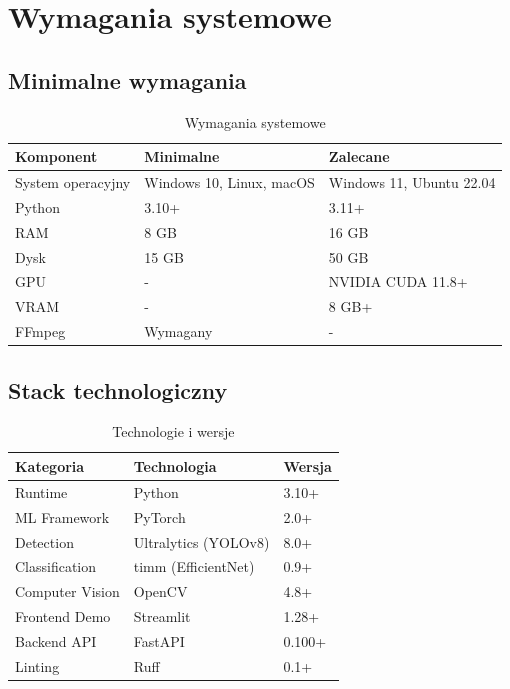 \documentclass[12pt,a4paper]{article}
\begin{document}
\section{Wymagania systemowe}

\subsection{Minimalne wymagania}

\begin{table}[H]
\centering
\caption{Wymagania systemowe}
\begin{tabular}{|l|l|l|}
\hline
\textbf{Komponent} & \textbf{Minimalne} & \textbf{Zalecane} \\
\hline
System operacyjny & Windows 10, Linux, macOS & Windows 11, Ubuntu 22.04 \\
Python & 3.10+ & 3.11+ \\
RAM & 8 GB & 16 GB \\
Dysk & 15 GB & 50 GB \\
GPU & - & NVIDIA CUDA 11.8+ \\
VRAM & - & 8 GB+ \\
FFmpeg & Wymagany & - \\
\hline
\end{tabular}
\end{table}

\subsection{Stack technologiczny}

\begin{table}[H]
\centering
\caption{Technologie i wersje}
\begin{tabular}{|l|l|l|}
\hline
\textbf{Kategoria} & \textbf{Technologia} & \textbf{Wersja} \\
\hline
Runtime & Python & 3.10+ \\
ML Framework & PyTorch & 2.0+ \\
Detection & Ultralytics (YOLOv8) & 8.0+ \\
Classification & timm (EfficientNet) & 0.9+ \\
Computer Vision & OpenCV & 4.8+ \\
Frontend Demo & Streamlit & 1.28+ \\
Backend API & FastAPI & 0.100+ \\
Linting & Ruff & 0.1+ \\
\hline
\end{tabular}
\end{table}
\end{document}
